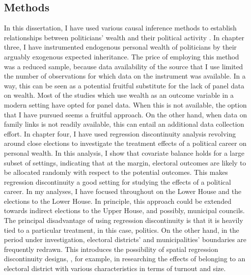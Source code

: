 \subsection{Methods}
In this dissertation, I have used various causal inference methods to establish relationships between politicians' wealth and their political activity \citep{cunningham2021causal}. In chapter three, I have instrumented endogenous personal wealth of politicians by their arguably exogenous expected inheritance. The price of employing this method was a reduced sample, because data availability of the source that I use limited the number of observations for which data on the instrument was available. In a way, this can be seen as a potential fruitful substitute for the lack of panel data on wealth. Most of the studies which use wealth as an outcome variable \citep{fisman2014private, berg2020politicians, berg2020returns} in a modern setting have opted for panel data. When this is not available, the option that I have pursued seems a fruitful approach. On the other hand, when data on family links is not readily available, this can entail an additional data collection effort. In chapter four, I have used regression discontinuity analysis revolving around close elections to investigate the treatment effects of a political career on personal wealth. In this analysis, I show that covariate balance holds for a large subset of settings, indicating that at the margin, electoral outcomes are likely to be allocated randomly with respect to the potential outcomes. This makes regression discontinuity a good setting for studying the effects of a political career. In my analyses, I have focused throughout on the Lower House and the elections to the Lower House. In principle, this approach could be extended towards indirect elections to the Upper House, and possibly, municipal councils. The principal disadvantage of using regression discontinuity is that it is heavily tied to a particular treatment, in this case, politics. On the other hand, in the period under investigation, electoral districts' and municipalities' boundaries are frequently redrawn. This introduces the possibility of spatial regression discontinuity designs, \citep[e.g.][]{dell2010persistent, egger2015causal, lowes2021concessions}, for example, in researching the effects of belonging to an electoral district with various characteristics in terms of turnout and size. 

